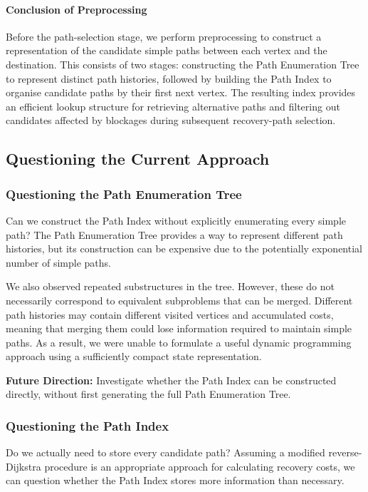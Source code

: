\documentclass{article}
\begin{document}
\paragraph{Conclusion of Preprocessing}

Before the path-selection stage, we perform preprocessing to construct a representation of the candidate simple paths between each vertex and the destination. This consists of two stages: constructing the Path Enumeration Tree to represent distinct path histories, followed by building the Path Index to organise candidate paths by their first next vertex. The resulting index provides an efficient lookup structure for retrieving alternative paths and filtering out candidates affected by blockages during subsequent recovery-path selection.

\subsection{Questioning the Current Approach}

\subsubsection{Questioning the Path Enumeration Tree}

Can we construct the Path Index without explicitly enumerating every simple path? The Path Enumeration Tree provides a way to represent different path histories, but its construction can be expensive due to the potentially exponential number of simple paths.

We also observed repeated substructures in the tree. However, these do not necessarily correspond to equivalent subproblems that can be merged. Different path histories may contain different visited vertices and accumulated costs, meaning that merging them could lose information required to maintain simple paths. As a result, we were unable to formulate a useful dynamic programming approach using a sufficiently compact state representation.

\textbf{Future Direction:} Investigate whether the Path Index can be constructed directly, without first generating the full Path Enumeration Tree.

\subsubsection{Questioning the Path Index}

Do we actually need to store every candidate path? Assuming a modified reverse-Dijkstra procedure is an appropriate approach for calculating recovery costs, we can question whether the Path Index stores more information than necessary.
\end{document}
